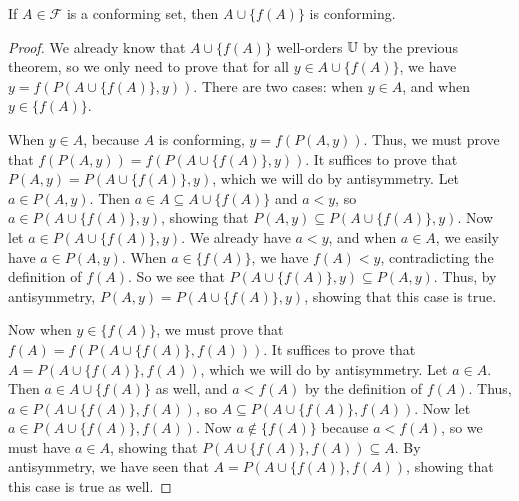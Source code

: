\documentclass[../math.tex]{subfiles}
\begin{document}
\begin{lemma} \label{conforming-add-conforming}
    If $A \in \mathcal F$ is a conforming set, then $A \cup \{f(A)\}$ is
    conforming.
\end{lemma}
\begin{proof}
    We already know that $A \cup \{f(A)\}$ well-orders $\mathbb{U}$ by the previous
    theorem, so we only need to prove that for all $y \in A \cup \{f(A)\}$, we
    have $y = f(P(A \cup \{f(A)\}, y))$.  There are two cases: when $y
    \in A$, and when $y \in \{f(A)\}$.

    When $y \in A$, because $A$ is conforming, $y = f(P(A, y))$.  Thus, we must
    prove that $f(P(A, y)) = f(P(A \cup \{f(A)\}, y))$.  It suffices to prove
    that $P(A, y) = P(A \cup \{f(A)\}, y)$, which we will do by antisymmetry.
    Let $a \in P(A, y)$.  Then $a \in A \subseteq A \cup \{f(A)\}$ and $a < y$,
    so $a \in P(A \cup \{f(A)\}, y)$, showing that $P(A, y) \subseteq P(A \cup
    \{f(A)\}, y)$.  Now let $a \in P(A \cup \{f(A)\}, y)$.  We already have $a <
    y$, and when $a \in A$, we easily have $a \in P(A, y)$.
    When $a \in \{f(A)\}$, we have $f(A) < y$, contradicting the definition of
    $f(A)$.  So we see that $P(A \cup \{f(A)\}, y) \subseteq P(A, y)$.  Thus, by
    antisymmetry, $P(A, y) = P(A \cup \{f(A)\}, y)$, showing that this case is
    true.

    Now when $y \in \{f(A)\}$, we must prove that $f(A) = f(P(A \cup \{f(A)\},
    f(A)))$.  It suffices to prove that $A = P(A \cup \{f(A)\}, f(A))$, which we
    will do by antisymmetry.  Let $a \in A$.  Then $a \in A \cup \{f(A)\}$ as
    well, and $a < f(A)$ by the definition of $f(A)$.  Thus, $a \in P(A \cup
    \{f(A)\}, f(A))$, so $A \subseteq P(A \cup \{f(A)\}, f(A))$.  Now let $a \in
    P(A \cup \{f(A)\}, f(A))$.  Now $a \notin \{f(A)\}$ because $a < f(A)$, so
    we must have $a \in A$, showing that $P(A \cup \{f(A)\}, f(A)) \subseteq A$.
    By antisymmetry, we have seen that $A = P(A \cup \{f(A)\}, f(A))$, showing
    that this case is true as well.
\end{proof}
\end{document}
